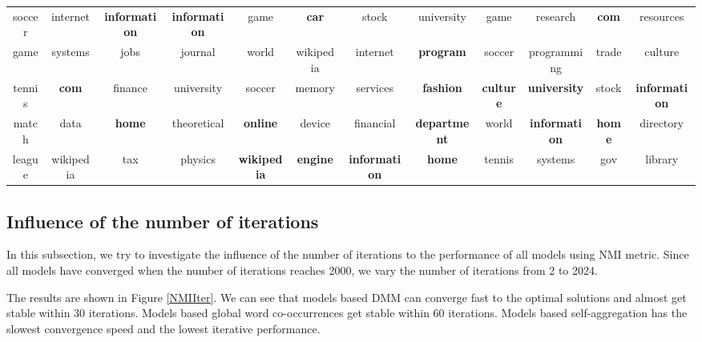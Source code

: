 \documentclass[10pt,journal,compsoc]{IEEEtran}
\begin{document}
{\begin{table}
{\begin{tabular}{|cccc|cccc|cccc|}
    {soccer}&{internet}&\textbf{information}&\textbf{information}&{game}&{\textbf{car}}&{stock}&{university}&{game}&{research}&\textbf{com}&{resources}\\
    {game}&{systems}&{jobs}&{journal}&{world}&{wikipedia}&{internet}&{\textbf{program}}&{soccer}&{programming}&{trade}&{culture}\\
    {tennis}&\textbf{com}&{finance}&{university}&{soccer}&{memory}&{services}&{\textbf{fashion}}&{\textbf{culture}}&{\textbf{university}}&{stock}&\textbf{information}\\
    {match}&{data}&{\textbf{home}}&{theoretical}&{\textbf{online}}&{device}&{financial}&{\textbf{department}}&{world}&\textbf{information}&{\textbf{home}}&{directory}\\
    {league}&{wikipedia}&{tax}&{physics}&{\textbf{wikipedia}}&\textbf{engine}&\textbf{information}&{\textbf{home}}&{tennis}&{systems}&{gov}&{library}\\
    \hline
  \end{tabular}}
  
\end{table}



\subsection{Influence of the number of iterations}

In this subsection, we try to investigate the influence of the number of iterations to the performance of all models using NMI metric. Since all models have converged when the number of iterations reaches 2000, we vary the number of iterations from 2 to 2024.

The results are shown in Figure \ref{NMIIter}. We can see that models based DMM can converge fast to the optimal solutions and almost get stable within 30 iterations. Models based global word co-occurrences get stable within 60 iterations. Models based self-aggregation has the slowest convergence speed and the lowest iterative performance. 

}
\end{document}
